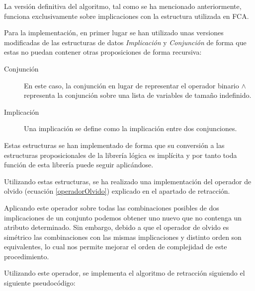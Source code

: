 	La versión definitiva del algoritmo, tal como se ha mencionado anteriormente, funciona exclusivamente sobre implicaciones con la estructura utilizada en FCA.
	
	Para la implementación, en primer lugar se han utilizado unas versiones modificadas de las estructuras de datos \textit{Implicación} y \textit{Conjunción} de forma que estas no puedan contener otras proposiciones de forma recursiva:
	
	\begin{description}
		\item[Conjunción] En este caso, la conjunción en lugar de representar el operador binario $\wedge$ representa la conjunción sobre una lista de variables de tamaño indefinido.
		\item[Implicación] Una implicación se define como la implicación entre dos conjunciones.
	\end{description}

	Estas estructuras se han implementado de forma que su conversión a las estructuras proposicionales de la librería lógica es implícita y por tanto toda función de esta librería puede seguir aplicándose.
	
	Utilizando estas estructuras, se ha realizado una implementación del operador de olvido (ecuación \ref{operadorOlvido}) explicado en el apartado de retracción.
	
	Aplicando este operador sobre todas las combinaciones posibles de dos implicaciones de un conjunto podemos obtener uno nuevo que no contenga un atributo determinado. Sin embargo, debido a que el operador de olvido es simétrico las combinaciones con las mismas implicaciones y distinto orden son equivalentes, lo cual nos permite mejorar el orden de complejidad de este procedimiento.
	
	Utilizando este operador, se implementa el algoritmo de retracción siguiendo el siguiente pseudocódigo: 
	
	{
		\centering
		\noindent{}	

	}
	
